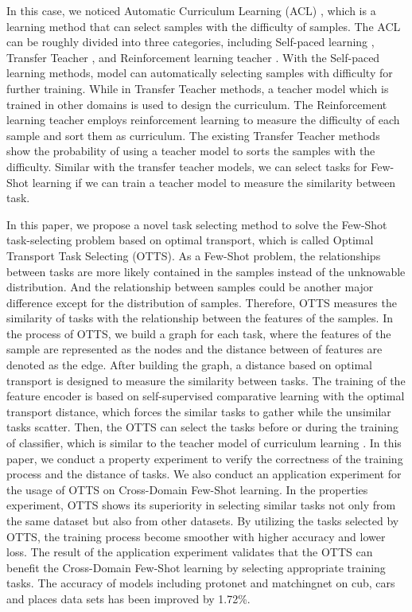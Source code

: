 \documentclass[10pt,journal,compsoc]{IEEEtran}
\begin{document}
In this case, we noticed Automatic Curriculum Learning (ACL) \cite{CL_1,CL_2,CL_3,CL_survey}, which is a learning method that can select samples with the difficulty of samples. The ACL can be roughly divided into three categories, including Self-paced learning \cite{self_paced,self_paced_2}, Transfer Teacher \cite{transfer_teacher_1, transfer_teacher_2}, and Reinforcement learning teacher \cite{Reinforce_teacher_1,Reinforce_teacher_2}. With the Self-paced learning methods, model can automatically selecting samples with difficulty for further training. While in Transfer Teacher methods, a teacher model which is trained in other domains is used to design the curriculum. The Reinforcement learning teacher employs reinforcement learning to measure the difficulty of each sample and sort them as curriculum. The existing Transfer Teacher methods show the probability of using a teacher model to sorts the samples with the difficulty. Similar with the transfer teacher models, we can select tasks for Few-Shot learning if we can train a teacher model to measure the similarity between task.



In this paper, we propose a novel task selecting method to solve the Few-Shot task-selecting problem based on optimal transport, which is called Optimal Transport Task Selecting (OTTS). As a Few-Shot problem, the relationships between tasks are more likely contained in the samples instead of the unknowable distribution. And the relationship between samples could be another major difference except for the distribution of samples. Therefore, OTTS measures the similarity of tasks with the relationship between the features of the samples. In the process of OTTS, we build a graph for each task, where the features of the sample are represented as the nodes and the distance between of features are denoted as the edge. After building the graph, a distance based on optimal transport is designed to measure the similarity between tasks. The training of the feature encoder is based on self-supervised comparative learning with the optimal transport distance, which forces the similar tasks to gather while the unsimilar tasks scatter. Then, the OTTS can select the tasks before or during the training of classifier, which is similar to the teacher model of curriculum learning \cite{CL_1,CL_2,CL_3,CL_survey}. In this paper, we conduct a property experiment to verify the correctness of the training process and the distance of tasks. We also conduct an application experiment for the usage of OTTS on Cross-Domain Few-Shot learning. In the properties experiment, OTTS shows its superiority in selecting similar tasks not only from the same dataset but also from other datasets. By utilizing the tasks selected by OTTS, the training process become smoother with higher accuracy and lower loss. The result of the application experiment validates that the OTTS can benefit the Cross-Domain Few-Shot learning by selecting appropriate training tasks. The accuracy of models including protonet and matchingnet on cub, cars and places data sets has been improved by 1.72\%.
\end{document}
